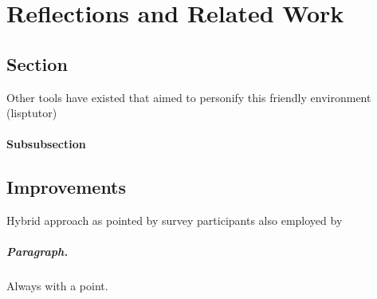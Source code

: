 \chapter{Reflections and Related Work}
\label{chap:reflection}
\section{Section}
Other tools have existed that aimed to personify this friendly environment (lisptutor)
\subsubsection{Subsubsection}

\section{Improvements}
Hybrid approach as pointed by survey participants also employed by \cite{harris_team, team_meta}
\paragraph{Paragraph.} Always with a point.
